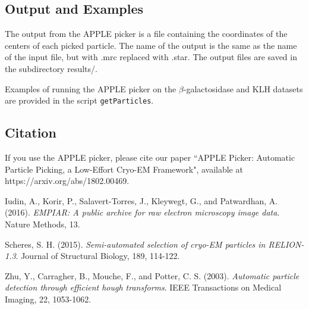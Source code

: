 \documentclass[12pt,a4paper]{article}
\begin{document}
\subsection{Output and Examples}
The output from the APPLE picker is a file containing the coordinates of the centers of each picked particle. The name of the output
is the same as the name of the input file, but with \textsf{.mrc} replaced with \textsf{.star}. The output files are
saved in the subdirectory \textsf{results/}.

Examples of running the APPLE picker on the $\beta$-galactosidase and KLH datasets are provided in the script \texttt{getParticles}.

\subsection{Citation}
If you use the APPLE picker, please cite our paper ``APPLE Picker: Automatic Particle Picking, a Low-Effort Cryo-EM Framework",
available at https://arxiv.org/abs/1802.00469.

\begin{thebibliography}{9}
Iudin, A., Korir, P., Salavert-Torres, J., Kleywegt, G., and Patwardhan,
 A. (2016). \textit{EMPIAR: A public archive for raw electron microscopy image data}.
 Nature Methods, 13.

Scheres, S. H. (2015). \textit{Semi-automated selection of cryo-EM
 particles in RELION-1.3}. Journal of Structural Biology,
 189, 114-122.

 Zhu, Y., Carragher, B., Mouche, F., and Potter, C. S. (2003).
 \textit{Automatic particle detection through efficient hough transforms}.
 IEEE Transactions on Medical Imaging, 22, 1053-1062.

\end{thebibliography}
\end{document}
